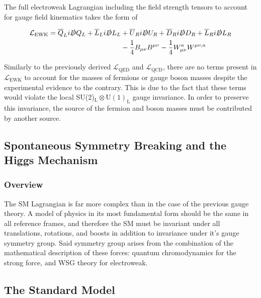 \documentclass[12pt,a4paper,epsf,portrait,times,epsfig]{report}
\begin{document}
	The full electroweak Lagrangian including the field strength tensors to account for gauge field kinematics takes the form of

	\begin{equation}
		\begin{split}
		\mathcal{L}_{\mathrm{EWK}}=\overline{Q}_{L}i\slashed{D}Q_{L}+\overline{L}_{L}i\slashed{D}L_{L} &+ \overline{U}_{R}i\slashed{D}U_{R}+\overline{D}_{R}i\slashed{D}D_{R}+\overline{L}_{R}i\slashed{D}L_{R}\\
		&- \frac{1}{4}B_{\mu\nu}B^{\mu\nu}-\frac{1}{4}W_{\mu\nu}^{a}W^{\mu\nu,a}\\
		\end{split}
	\end{equation}

	Similarly to the previously derived $\mathcal{L}_{\mathrm{QED}}$ and $\mathcal{L}_{\mathrm{QCD}}$, there are no terms present in $\mathcal{L}_{\mathrm{EWK}}$ to account for the masses of fermions or gauge boson masses despite the experimental evidence to the contrary. This is due to the fact that these terms would violate the local SU(2)$_{\mathrm{L}} \otimes \mathrm{U(1)}_{\mathrm{L}}$ gauge invariance. In order to preserve this invariance, the source of the fermion and boson masses must be contributed by another source. 

	\subsection{Spontaneous Symmetry Breaking and the Higgs Mechanism}


	\newpage

	\subsubsection{Overview}

	The SM Lagrangian is far more complex than in the case of the previous gauge theory. A model of physics in its most fundamental form should be the same in all reference frames, and therefore the SM must be invariant under all translations, rotations, and boosts in addition to invariance under it's gauge symmetry group. Said symmetry group arises from the combination of the mathematical description of these forces: quantum chromodynamics for the strong force, and WSG theory for electroweak.



	\subsection{The Standard Model}
\end{document}
